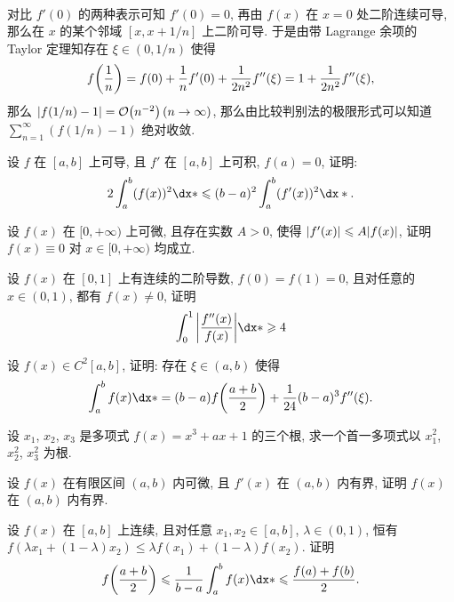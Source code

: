 \begin{exercise}[series=exer]
\begin{answer}
\begin{align*}
      \end{align*}
      对比 $ f'(0) $ 的两种表示可知 $ f'(0) = 0 $, 再由 $ f(x) $ 在 $ x = 0 $ 处二阶连续可导, 那么在 $ x $ 的某个邻域 $ [x, x+1/n] $ 上二阶可导. 于是由带 Lagrange 余项的 Taylor 定理知存在 $ \xi \in (0, 1/n) $ 使得
      \begin{align*}
          f\qty(\frac{1}{n}) = f(0) + \frac{1}{n}f'(0) + \frac{1}{2n^{2}}f''(\xi) = 1 + \frac{1}{2n^{2}}f''(\xi),
      \end{align*}
      那么 $ \abs{f(1/n) - 1} = \order{n^{-2}}\,(n \to \infty) $, 那么由比较判别法的极限形式可以知道 $ \sum_{n = 1}^{\infty} (f(1/n) - 1) $ 绝对收敛.
  \end{answer}
  \item 设 $ f $ 在 $ [a, b] $ 上可导, 且 $ f' $ 在 $ [a, b] $ 上可积, $ f(a) = 0 $, 证明:
  \begin{align*}
      2\int_{a}^{b}(f(x))^{2} \dx* \le (b-a)^{2} \int_{a}^{b} (f'(x))^{2} \dx*.
  \end{align*}
  \item 设 $ f(x) $ 在 $ [0, +\infty) $ 上可微, 且存在实数 $ A > 0 $, 使得 $ \abs{f'(x)} \leqslant A\abs{f(x)} $, 证明 $ f(x) \equiv 0 $ 对 $ x \in [0, +\infty) $ 均成立.
  \item 设 $ f(x) $ 在 $ [0, 1] $ 上有连续的二阶导数, $ f(0) = f(1) = 0 $, 且对任意的 $ x \in (0, 1) $, 都有 $ f(x) \ne 0 $, 证明
  \begin{align*}
      \int_{0}^{1} \abs{f''(x)\over f(x)} \dx* \ge 4
  \end{align*}
  \item 设 $ f(x) \in C^{2}[a, b] $, 证明: 存在 $ \xi \in (a, b) $ 使得
  \begin{align*}
      \int_{a}^{b} f(x) \dx* = (b - a) f\qty(\frac{a + b}{2}) + \frac{1}{24}(b - a)^{3} f''(\xi).
  \end{align*}
  \item 设 $ x_{1} $, $ x_{2} $, $ x_{3} $ 是多项式 $ f(x) = x^{3} + ax + 1 $ 的三个根, 求一个首一多项式以 $ x_{1}^{2} $, $ x_{2}^{2} $, $ x_{3}^{2} $ 为根.
  \item 设 $ f(x) $ 在有限区间 $ (a, b) $ 内可微, 且 $ f'(x) $ 在 $ (a, b) $ 内有界, 证明 $ f(x) $ 在 $ (a, b) $ 内有界.
  \item 设 $ f(x) $ 在 $ [a, b] $ 上连续, 且对任意 $ x_{1}, x_{2} \in [a, b] $, $ \lambda \in (0, 1) $, 恒有 $ f(\lambda x_{1} + (1-\lambda) x_{2}) \le \lambda f(x_{1}) + (1 - \lambda) f(x_{2}) $. 证明
  \begin{align*}
      f\qty(\frac{a+b}{2}) \le \frac{1}{b - a}\int_{a}^{b} f(x) \dx* \le \frac{f(a) + f(b)}{2}.

\end{align*}
\end{exercise}
